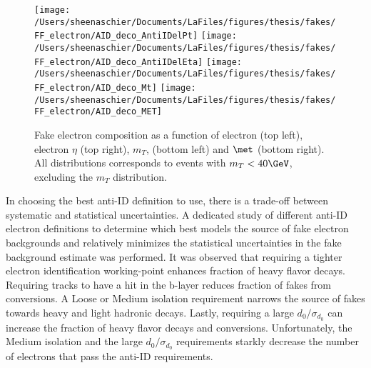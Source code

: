 \begin{figure}[htb]
        \centering
         \texttt{[image: /Users/sheenaschier/Documents/LaFiles/figures/thesis/fakes/FF\_electron/AID\_deco\_AntiIDelPt]}
        \texttt{[image: /Users/sheenaschier/Documents/LaFiles/figures/thesis/fakes/FF\_electron/AID\_deco\_AntiIDelEta]}
        \texttt{[image: /Users/sheenaschier/Documents/LaFiles/figures/thesis/fakes/FF\_electron/AID\_deco\_Mt]}
        \texttt{[image: /Users/sheenaschier/Documents/LaFiles/figures/thesis/fakes/FF\_electron/AID\_deco\_MET]}
        \caption{Fake electron composition as a function of electron \pt{} (top left), electron $\eta$ (top right), $m_{T}$, (bottom left) and $\met$ (bottom right). All distributions corresponds to events with $m_{T} < 40\GeV$, excluding the $m_{T}$ distribution. }
        \label{fig:elDeco}
\end{figure}
In choosing the best anti-ID definition to use, there is a trade-off between systematic and statistical uncertainties.  A dedicated study of different anti-ID electron definitions to determine which best models the source of fake electron backgrounds and relatively minimizes the statistical uncertainties in the fake background estimate was performed.  It was observed that requiring a tighter electron identification working-point enhances fraction of heavy flavor decays.  Requiring tracks to have a hit in the b-layer reduces fraction of fakes from conversions.  A Loose or Medium isolation requirement narrows the source of fakes towards heavy and light hadronic decays.  Lastly, requiring a large $d_0/\sigma_{d_0}$ can increase the fraction of heavy flavor decays and conversions.  Unfortunately, the Medium isolation and the large $d_0/\sigma_{d_0}$ requirements starkly decrease the number of electrons that pass the anti-ID requirements.
